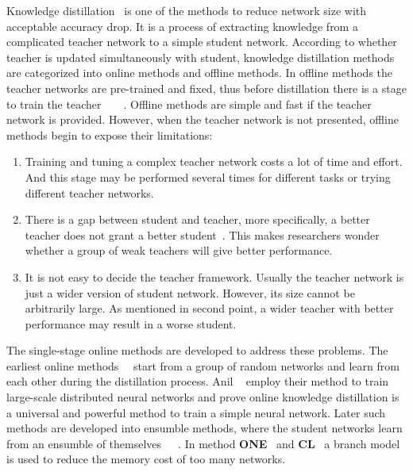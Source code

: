 \documentclass[10pt,twocolumn,letterpaper]{article}
\begin{document}
Knowledge distillation~\cite{hinton2015distilling} is one of the methods to reduce
network size with acceptable accuracy drop. It is a process of extracting knowledge
from a complicated teacher network to a simple student network. According to whether teacher is updated simultaneously with student, knowledge distillation methods
are categorized into online methods and offline methods. In offline methods the teacher networks
are pre-trained and fixed, thus before distillation there is a stage to train the teacher~\cite{liu2019knowledge}~\cite{mirzadeh2020improved}~\cite{passalis2020heterogeneous}~\cite{romero2014fitnets}.
Offline methods are simple and fast if the teacher network is provided. However, when the teacher network is not presented,
offline methods begin to expose their limitations:
\begin{enumerate}
   \item Training and tuning a complex teacher network costs a lot of time and effort. And this stage may be performed several times for different tasks or trying different teacher networks.
   \item There is a gap between student and teacher, more specifically, a better teacher does not grant a better student~\cite{mirzadeh2020improved}. This makes researchers wonder whether a group of weak teachers will give better performance.
   \item It is not easy to decide the teacher framework. Usually the teacher network is just a wider version of student network. However, its size cannot be arbitrarily large. As mentioned in second point,
   a wider teacher with better performance may result in a worse student.
 \end{enumerate}

The single-stage online methods are developed to address these problems.
The earliest online methods~\cite{anil2018large}~\cite{zhang2018deep} start from a group of random networks and 
learn from each other during the distillation process. Anil \etal~\cite{anil2018large} employ their method to train
large-scale distributed neural networks and prove online knowledge distillation is a universal and powerful method
to train a simple neural network. Later such methods are developed into ensumble methods, where the student networks learn
from an ensumble of themselves~\cite{chen2020online}~\cite{guo2020online}~\cite{lan2018knowledge}. In method \textbf{ONE}~\cite{lan2018knowledge} and \textbf{CL}~\cite{song2018collaborative} a branch model is used to reduce the memory cost of too many networks.
\end{document}
